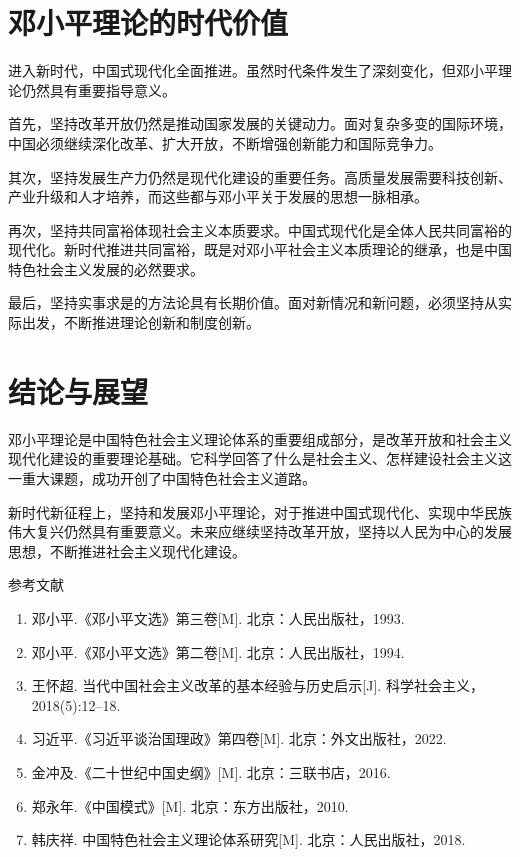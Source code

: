 \documentclass[12pt,a4paper]{article}
\begin{document}
\section{邓小平理论的时代价值}

进入新时代，中国式现代化全面推进。虽然时代条件发生了深刻变化，但邓小平理论仍然具有重要指导意义。

首先，坚持改革开放仍然是推动国家发展的关键动力。面对复杂多变的国际环境，中国必须继续深化改革、扩大开放，不断增强创新能力和国际竞争力。

其次，坚持发展生产力仍然是现代化建设的重要任务。高质量发展需要科技创新、产业升级和人才培养，而这些都与邓小平关于发展的思想一脉相承。

再次，坚持共同富裕体现社会主义本质要求。中国式现代化是全体人民共同富裕的现代化。新时代推进共同富裕，既是对邓小平社会主义本质理论的继承，也是中国特色社会主义发展的必然要求。

最后，坚持实事求是的方法论具有长期价值。面对新情况和新问题，必须坚持从实际出发，不断推进理论创新和制度创新。

\section{结论与展望}

邓小平理论是中国特色社会主义理论体系的重要组成部分，是改革开放和社会主义现代化建设的重要理论基础。它科学回答了什么是社会主义、怎样建设社会主义这一重大课题，成功开创了中国特色社会主义道路。

新时代新征程上，坚持和发展邓小平理论，对于推进中国式现代化、实现中华民族伟大复兴仍然具有重要意义。未来应继续坚持改革开放，坚持以人民为中心的发展思想，不断推进社会主义现代化建设。

\newpage
\begin{center}
{\heiti{} 参考文献}
\end{center}

\begin{enumerate}
\item 邓小平.《邓小平文选》第三卷[M]. 北京：人民出版社，1993.
\item 邓小平.《邓小平文选》第二卷[M]. 北京：人民出版社，1994.
\item 王怀超. 当代中国社会主义改革的基本经验与历史启示[J]. 科学社会主义，2018(5):12--18.
\item 习近平.《习近平谈治国理政》第四卷[M]. 北京：外文出版社，2022.
\item 金冲及.《二十世纪中国史纲》[M]. 北京：三联书店，2016.
\item 郑永年.《中国模式》[M]. 北京：东方出版社，2010.
\item 韩庆祥. 中国特色社会主义理论体系研究[M]. 北京：人民出版社，2018.
\end{enumerate}
\end{document}
